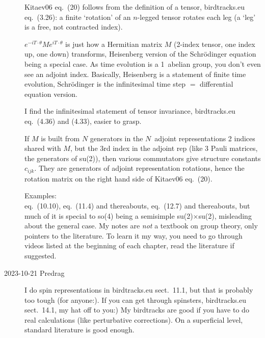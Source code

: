 \begin{description}
Kitaev06 
{eq.~(20)} follows from the definition of a tensor,
{birdtracks.eu eq.~(3.26)}:
a finite `rotation' of an
$n$-legged tensor rotates each leg (a `leg' is a free, not contracted index).

$e^{-iT\cdot\theta} M e^{iT\cdot\theta}$
is just how a Hermitian matrix $M$ (2-index tensor, one index up, one
down) transforms, Heisenberg version of the Schr{\"o}dinger equation
being a special case. As time evolution is a 1\dmn\,
abelian group, you don't even see an adjoint index.
Basically, Heisenberg is a statement of finite time
evolution,  Schr{\"o}dinger is the infinitesimal time step $=$
differential equation version.

I find the infinitesimal statement of tensor invariance,
{birdtracks.eu eq.~(4.36)} and
{(4.33)},
easier to grasp.

If $M$ is built from $N$ generators in the $N$\dmn\ adjoint representations
2 indices shared with $M$, but the 3rd index in the adjoint rep (like 3
Pauli matrices, the generators of su(2)),  then various commutators give
structure constants $c_{ijk}$. They are generators of adjoint
representation rotations, hence the rotation matrix on the right hand
side of Kitaev06 {eq.~(20)}.

Examples:\\
{eq.~(10.10)},
{eq.~(11.4)} and thereabouts,
{eq.~(12.7)}  and thereabouts,
but much of it is special to so(4) being a semisimple su(2)$\times$su(2),
misleading about the general case. My notes are \emph{not} a textbook
on group theory, only pointers to the literature. To learn it my way, you
need to go through videos listed at the beginning of each chapter, read
the literature if suggested.

\item[2023-10-21 Predrag]

I do spin representations in
{birdtracks.eu sect.~11.1},
but that is probably too tough (for anyone:).
If you can get through spinsters,
{birdtracks.eu sect.~14.1}, my hat off to you:)
My birdtracks are good if you have to do real calculations (like
perturbative corrections). On a superficial level, standard literature is
good enough.


\end{description}
